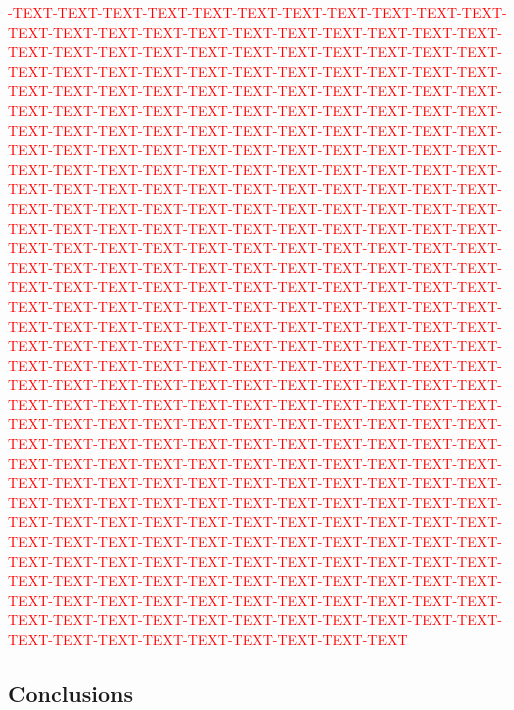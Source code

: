 \documentclass[a0,portrait]{a0poster}
\begin{document}
\begin{multicols}{3}
\textcolor{red}{-TEXT-TEXT-TEXT-TEXT-TEXT-TEXT-TEXT-TEXT-TEXT-TEXT-TEXT-TEXT-TEXT-TEXT-TEXT-TEXT-TEXT-TEXT-TEXT-TEXT-TEXT-TEXT-TEXT-TEXT-TEXT-TEXT-TEXT-TEXT-TEXT-TEXT-TEXT-TEXT-TEXT-TEXT-TEXT-TEXT-TEXT-TEXT-TEXT-TEXT-TEXT-TEXT-TEXT-TEXT-TEXT-TEXT-TEXT-TEXT-TEXT-TEXT-TEXT-TEXT-TEXT-TEXT-TEXT-TEXT-TEXT-TEXT-TEXT-TEXT-TEXT-TEXT-TEXT-TEXT-TEXT-TEXT-TEXT-TEXT-TEXT-TEXT-TEXT-TEXT-TEXT-TEXT-TEXT-TEXT-TEXT-TEXT-TEXT-TEXT-TEXT-TEXT-TEXT-TEXT-TEXT-TEXT-TEXT-TEXT-TEXT-TEXT-TEXT-TEXT-TEXT-TEXT-TEXT-TEXT-TEXT-TEXT-TEXT-TEXT-TEXT-TEXT-TEXT-TEXT-TEXT-TEXT-TEXT-TEXT-TEXT-TEXT-TEXT-TEXT-TEXT-TEXT-TEXT-TEXT-TEXT-TEXT-TEXT-TEXT-TEXT-TEXT-TEXT-TEXT-TEXT-TEXT-TEXT-TEXT-TEXT-TEXT-TEXT-TEXT-TEXT-TEXT-TEXT-TEXT-TEXT-TEXT-TEXT-TEXT-TEXT-TEXT-TEXT-TEXT-TEXT-TEXT-TEXT-TEXT-TEXT-TEXT-TEXT-TEXT-TEXT-TEXT-TEXT-TEXT-TEXT-TEXT-TEXT-TEXT-TEXT-TEXT-TEXT-TEXT-TEXT-TEXT-TEXT-TEXT-TEXT-TEXT-TEXT-TEXT-TEXT-TEXT-TEXT-TEXT-TEXT-TEXT-TEXT-TEXT-TEXT-TEXT-TEXT-TEXT-TEXT-TEXT-TEXT-TEXT-TEXT-TEXT-TEXT-TEXT-TEXT-TEXT-TEXT-TEXT-TEXT-TEXT-TEXT-TEXT-TEXT-TEXT-TEXT-TEXT-TEXT-TEXT-TEXT-TEXT-TEXT-TEXT-TEXT-TEXT-TEXT-TEXT-TEXT-TEXT-TEXT-TEXT-TEXT-TEXT-TEXT-TEXT-TEXT-TEXT-TEXT-TEXT-TEXT-TEXT-TEXT-TEXT-TEXT-TEXT-TEXT-TEXT-TEXT-TEXT-TEXT-TEXT-TEXT-TEXT-TEXT-TEXT-TEXT-TEXT-TEXT-TEXT-TEXT-TEXT-TEXT-TEXT-TEXT-TEXT-TEXT-TEXT-TEXT-TEXT-TEXT-TEXT-TEXT-TEXT-TEXT-TEXT-TEXT-TEXT-TEXT-TEXT-TEXT-TEXT-TEXT-TEXT-TEXT-TEXT-TEXT-TEXT-TEXT-TEXT-TEXT-TEXT-TEXT-TEXT-TEXT-TEXT-TEXT-TEXT-TEXT-TEXT-TEXT-TEXT-TEXT-TEXT-TEXT-TEXT-TEXT-TEXT-TEXT-TEXT-TEXT-TEXT-TEXT-TEXT-TEXT-TEXT-TEXT-TEXT-TEXT-TEXT-TEXT-TEXT-TEXT-TEXT-TEXT-TEXT-TEXT-TEXT-TEXT-TEXT-TEXT-TEXT-TEXT-TEXT-TEXT-TEXT-TEXT-TEXT-TEXT-TEXT-TEXT-TEXT-TEXT-TEXT-TEXT-TEXT-TEXT-TEXT-TEXT-TEXT-TEXT-TEXT-TEXT-TEXT-TEXT-TEXT-TEXT-TEXT-TEXT-TEXT-TEXT-TEXT-TEXT-TEXT-TEXT-TEXT-TEXT-TEXT-TEXT-TEXT-TEXT-TEXT-TEXT-TEXT-TEXT} 

\vspace{2cm}
\begin{tcolorbox}[width=0.95\linewidth,colback={conclusion},frame empty,boxsep=1cm]
\section{Conclusions}


\end{tcolorbox}
\end{multicols}
\end{document}
